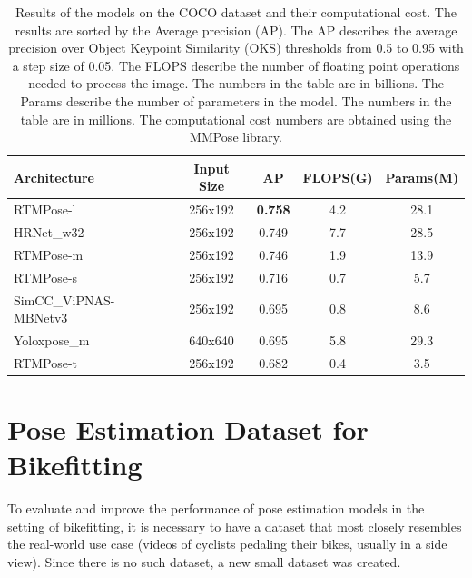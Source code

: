 \begin{table}[htb]

    \centering
    \begin{tabular}{lcccc}
        \toprule
        Architecture          & Input Size & AP             & FLOPS(G) & Params(M) \\
        \midrule
        RTMPose-l             & 256x192    & \textbf{0.758} & 4.2      & 28.1      \\
        HRNet\_w32            & 256x192    & 0.749          & 7.7      & 28.5      \\
        RTMPose-m             & 256x192    & 0.746          & 1.9      & 13.9      \\
        RTMPose-s             & 256x192    & 0.716          & 0.7      & 5.7       \\
        SimCC\_ViPNAS-MBNetv3 & 256x192    & 0.695          & 0.8      & 8.6       \\
        Yoloxpose\_m          & 640x640    & 0.695          & 5.8      & 29.3      \\
        RTMPose-t             & 256x192    & 0.682          & 0.4      & 3.5       \\


        \bottomrule
    \end{tabular}
    \caption{Results of the models on the COCO dataset and their computational cost. The results are sorted by the Average precision (AP). The AP describes the average precision over Object Keypoint Similarity (OKS) thresholds from 0.5 to 0.95 with a step size of 0.05. The FLOPS describe the number of floating point operations needed to process the image. The numbers in the table are in billions. The Params describe the number of parameters in the model. The numbers in the table are in millions. The computational cost numbers are obtained using the MMPose library.}
    \label{tab:evaluation_params}

\end{table}


\chapter{Pose Estimation Dataset for Bikefitting}
\label{ch:dataset}
To evaluate and improve the performance of pose estimation models in the setting of bikefitting, it is necessary to have a dataset that most closely resembles the real-world use case (videos of cyclists pedaling their bikes, usually in a side view). Since there is no such dataset, a new small dataset was created.

